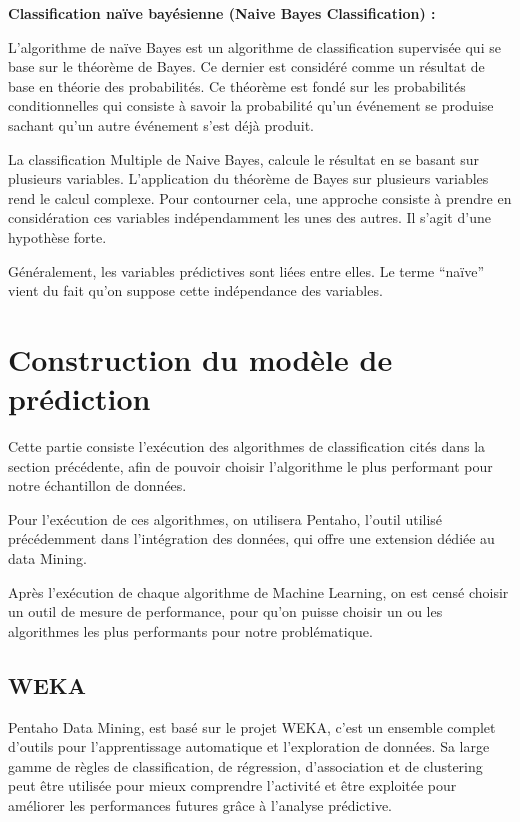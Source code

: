 \textbf{Classification naïve bayésienne (Naive Bayes Classification) : }
    
L'algorithme de naïve Bayes est un algorithme de classification supervisée qui se base sur le théorème de Bayes. Ce dernier est considéré comme un résultat de base en théorie des probabilités. Ce théorème est fondé sur les probabilités conditionnelles qui consiste à savoir la probabilité qu'un événement se produise sachant qu'un autre événement s’est déjà produit.


La classification Multiple de Naive Bayes,  calcule le résultat en se basant sur plusieurs variables. L’application du théorème de Bayes sur plusieurs variables rend le calcul complexe. Pour contourner cela, une approche consiste à prendre en considération ces variables indépendamment les unes des autres. Il s’agit d’une hypothèse forte.

Généralement, les variables prédictives sont liées entre elles. Le terme “naïve” vient du fait qu’on suppose cette indépendance des variables.\cite{NB}


\section{Construction du modèle de prédiction}

Cette partie consiste l'exécution des algorithmes de classification cités dans la section précédente, afin de pouvoir choisir l'algorithme le plus performant pour notre échantillon de données. 

Pour l'exécution de ces algorithmes, on utilisera  Pentaho, l'outil utilisé précédemment dans l'intégration des données, qui offre une extension dédiée au data Mining. 

Après l'exécution de chaque algorithme de Machine Learning, on est censé choisir un outil de mesure de performance, pour qu'on puisse choisir un ou les algorithmes les plus performants pour notre problématique. 

\subsection{WEKA}

Pentaho Data Mining, est basé sur le projet WEKA, c'est un ensemble complet d'outils pour l'apprentissage automatique et l'exploration de données. Sa large gamme de règles de classification, de régression, d'association et de clustering peut être utilisée pour mieux comprendre l'activité et être exploitée pour améliorer les performances futures grâce à l'analyse prédictive.

